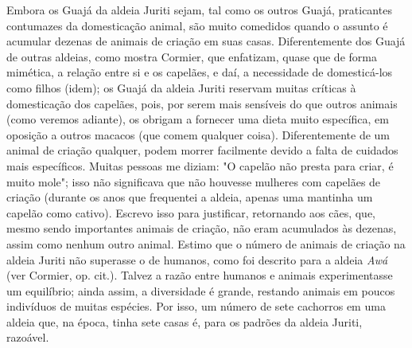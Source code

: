 Embora os Guajá da aldeia Juriti sejam, tal como os outros Guajá,
praticantes contumazes da domesticação animal, são muito comedidos
quando o assunto é acumular dezenas de animais de criação em suas casas.
Diferentemente dos Guajá de outras aldeias, como mostra Cormier, que
enfatizam, quase que de forma mimética, a relação entre si e os
capelães, e daí, a necessidade de domesticá-los como filhos (idem); os
Guajá da aldeia Juriti reservam muitas críticas à domesticação dos
capelães, pois, por serem mais sensíveis do que outros animais (como
veremos adiante), os obrigam a fornecer uma dieta muito específica, em
oposição a outros macacos (que comem qualquer coisa). Diferentemente de
um animal de criação qualquer, podem morrer facilmente devido a falta de
cuidados mais específicos. Muitas pessoas me diziam: "O capelão não
presta para criar, é muito mole"; isso não significava que não houvesse
mulheres com capelães de criação (durante os anos que frequentei a
aldeia, apenas uma mantinha um capelão como cativo). Escrevo isso para
justificar, retornando aos cães, que, mesmo sendo importantes animais de
criação, não eram acumulados às dezenas, assim como nenhum outro animal.
Estimo que o número de animais de criação na aldeia Juriti não superasse
o de humanos, como foi descrito para a aldeia \emph{Awá} (ver Cormier,
op. cit.). Talvez a razão entre humanos e animais experimentasse um
equilíbrio; ainda assim, a diversidade é grande, restando animais em
poucos indivíduos de muitas espécies. Por isso, um número de sete
cachorros em uma aldeia que, na época, tinha sete casas é, para os
padrões da aldeia Juriti, razoável.

